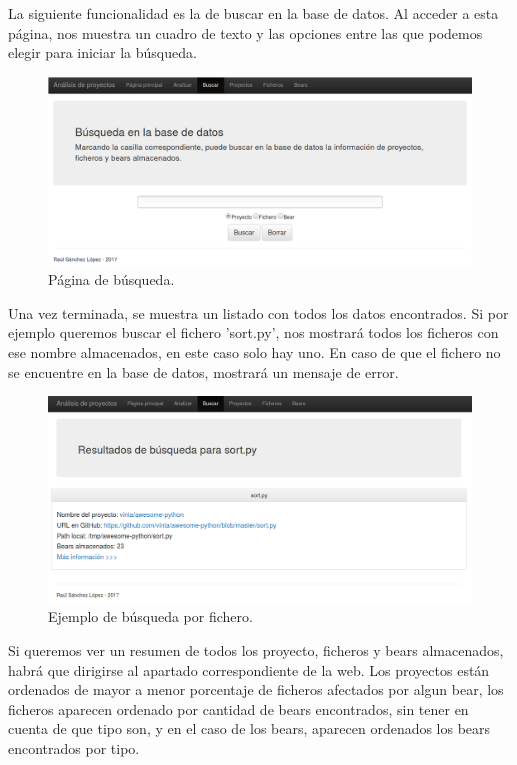 \documentclass[a4paper, 12pt]{book}
\begin{document}
La siguiente funcionalidad es la de buscar en la base de datos. Al acceder a esta página, nos muestra un cuadro de texto y las opciones entre las que podemos elegir para iniciar la búsqueda.

\begin{figure}[h]
  \centering
  \includegraphics[width=12cm, keepaspectratio]{img/webBuscar}
  \caption{Página de búsqueda.}
  \label{fig:webBuscar}
\end{figure}

Una vez terminada, se muestra un listado con todos los datos encontrados. Si por ejemplo queremos buscar el fichero 'sort.py', nos mostrará todos los ficheros con ese nombre almacenados, en este caso solo hay uno. En caso de que el fichero no se encuentre en la base de datos, mostrará un mensaje de error.
\begin{figure}[h]
  \centering
  \includegraphics[width=12cm, keepaspectratio]{img/resultadoBuscar}
  \caption{Ejemplo de búsqueda por fichero.}
  \label{fig:resultadoBuscar}
\end{figure}

Si queremos ver un resumen de todos los proyecto, ficheros y bears almacenados, habrá que dirigirse al apartado correspondiente de la web. Los proyectos están ordenados de mayor a menor porcentaje de ficheros afectados por algun bear, los ficheros aparecen ordenado por cantidad de bears encontrados, sin tener en cuenta de que tipo son, y en el caso de los bears, aparecen ordenados los bears encontrados por tipo.
\end{document}
